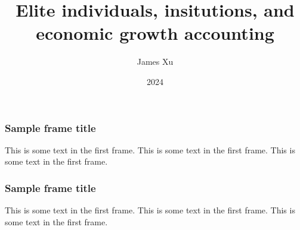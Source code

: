 \documentclass{beamer}
\title{Elite individuals, insitutions, and economic growth accounting}
\author{James Xu}
\institute{ECON 442, Duke University}
\date{2024}
\begin{document}
\frame{\titlepage}

\begin{frame}
\frametitle{Sample frame title}
This is some text in the first frame. This is some text in the first frame. This is some text in the first frame.
\end{frame}

\begin{frame}
    \frametitle{Sample frame title}
    This is some text in the first frame. This is some text in the first frame. This is some text in the first frame.
    \end{frame}
\end{document}
